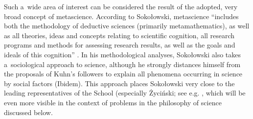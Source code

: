 \documentclass[%
  manuscript=article,
  year=2024,
  volume=77,
  doi=00000.000,
]{zfn}
\begin{document}
Such a~wide area of interest can be considered the result of the adopted, very broad concept of metascience. According to Sokołowski, metascience ``includes both the methodology of deductive sciences (primarily metamathematics), as well as all theories, ideas and concepts relating to scientific cognition, all research programs and methods for assessing research results, as well as the goals and ideals of this cognition''
\parencite[][p.57]{Sokoowski1999Maa}. %
 In his methodological analyses, Sokołowski also takes a~sociological approach to science, although he strongly distances himself from the proposals of Kuhn's followers to explain all phenomena occurring in science by social factors (Ibidem). This approach places Sokołowski very close to the leading representatives of the School (especially Życiński; see e.g. 
\parencite[][]{Zycinski1993Granice}, %
 which will be even more visible in the context of problems in the philosophy of science discussed below.
\end{document}
